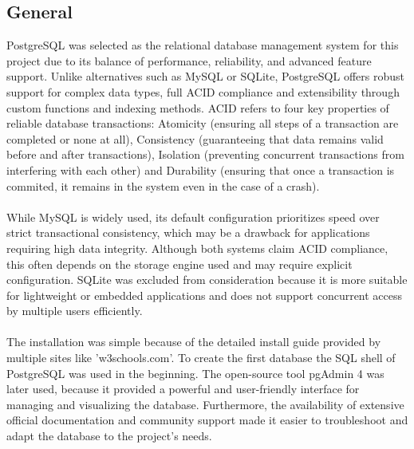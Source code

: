 \documentclass[a4paper,12pt]{report}
\begin{document}
\subsection{General}
PostgreSQL was selected as the relational database management system for this project due to its balance of performance, reliability, and advanced feature support. Unlike alternatives such as MySQL or SQLite, PostgreSQL offers robust support for complex data types, full ACID compliance and extensibility through custom functions and indexing methods. ACID refers to four key properties of reliable database transactions: Atomicity (ensuring all steps of a transaction are completed or none at all), Consistency (guaranteeing that data remains valid before and after transactions), Isolation (preventing concurrent transactions from interfering with each other) and Durability (ensuring that once a transaction is commited, it remains in the system even in the case of a crash). \parencite{postgresdocs} \parencite{acid}\\\\
While MySQL is widely used, its default configuration prioritizes speed over strict transactional consistency, which may be a drawback for applications requiring high data integrity. Although both systems claim ACID compliance, this often depends on the storage engine used and may require explicit configuration. SQLite was excluded from consideration because it is more suitable for lightweight or embedded applications and does not support concurrent access by multiple users efficiently. \parencite{postgresvsMysql}\\\\
The installation was simple because of the detailed install guide provided by multiple sites like 'w3schools.com'. To create the first database the SQL shell of PostgreSQL was used in the beginning. The open-source tool pgAdmin 4 was later used, because it  provided a powerful and user-friendly interface for managing and visualizing the database. Furthermore, the availability of extensive official documentation and community support made it easier to troubleshoot and adapt the database to the project’s needs. \parencite{pgAdmin} \parencite{pgsinstallation} \\
\end{document}
